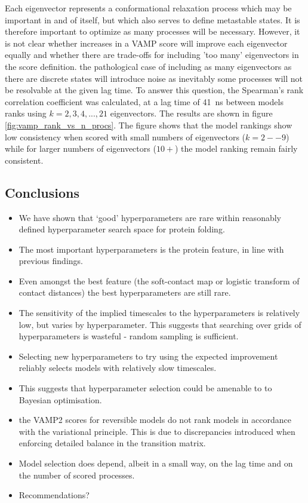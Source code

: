 \documentclass[journal=jacsat,manuscript=article]{achemso}
\begin{document}
Each eigenvector represents a conformational relaxation process which may be important in and of itself, but which also serves to define metastable states. It is therefore important to optimize as many processes will be necessary. However, it is not clear whether increases in a VAMP score will improve each eigenvector equally and whether there are trade-offs for including 'too many' eigenvectors in the score definition. the pathological case of including as many eigenvectors as there are discrete states will introduce noise as inevitably some processes will not be resolvable at the given lag time.  To answer this question, the Spearman's rank correlation coefficient was calculated, at a lag time of \SI{41}{\nano\second}  between models ranks using $k=2, 3, 4, ..., 21$ eigenvectors.  The results are shown in figure \ref{fig:vamp_rank_vs_n_procs}. The figure shows that the model rankings show low consistency when scored with small numbers of eigenvectors ($k=2 -- 9$) while for larger numbers of eigenvectors ($10+$) the model ranking remain fairly consistent. 


\subsection{Conclusions}

\begin{itemize}
    \item We have shown that `good' hyperparameters are rare within reasonably defined hyperparameter search space for protein folding. 
    \item The most important hyperparameters is the protein feature, in line with previous findings.  
    \item Even amongst the best feature (the soft-contact map or logistic transform of contact distances) the best hyperparameters are still rare. 
    \item The sensitivity of the implied timescales to the hyperparameters is relatively low, but varies by hyperparameter. This suggests that searching over grids of hyperparameters is wasteful - random sampling is sufficient.  
    \item Selecting new hyperparameters to try using the expected improvement reliably selects models with relatively slow timescales.  
    \item This suggests that hyperparameter selection could be amenable to to Bayesian optimisation. 
    \item the VAMP2 scores for reversible models do not rank models in accordance with the variational principle. This is due to discrepancies introduced when enforcing detailed balance in the transition matrix.  
    \item Model selection does depend, albeit in a small way, on the lag time and on the number of scored processes.  
    \item Recommendations? 
\end{itemize}
\end{document}
